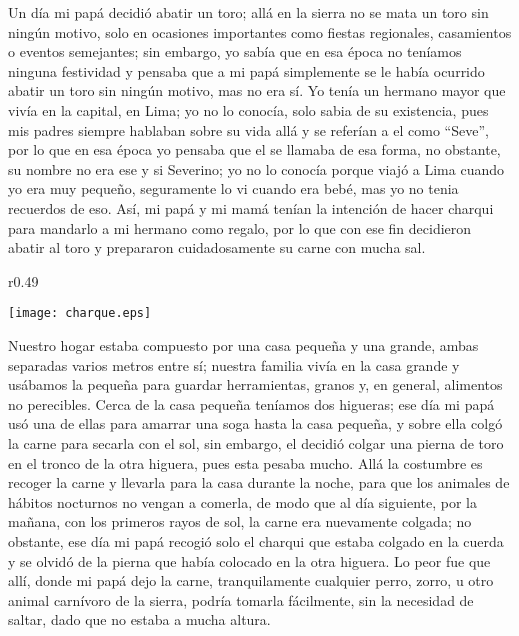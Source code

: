 Un día mi papá decidió abatir un toro; allá en la sierra no se mata un toro sin ningún motivo, solo en ocasiones importantes como fiestas regionales, casamientos o eventos semejantes; sin embargo, yo sabía que en esa época no teníamos ninguna festividad y pensaba que a mi papá simplemente se le había ocurrido abatir un toro sin ningún motivo, mas no era sí.
Yo tenía un hermano mayor que vivía en la capital, en Lima; yo no lo conocía, solo sabia de su existencia, pues mis padres siempre hablaban sobre su vida allá y se referían a el como ``Seve'', por lo que en esa época yo pensaba que el se llamaba de esa forma, no obstante, su nombre no era ese y si Severino; yo no lo conocía porque viajó a Lima cuando yo era muy pequeño, seguramente lo vi cuando era bebé, mas yo no tenia recuerdos de eso.
Así, mi papá y mi mamá tenían la intención de hacer charqui para mandarlo a mi hermano como regalo, por lo que con ese fin decidieron abatir al toro y prepararon cuidadosamente su carne con mucha sal.

\ifdefined\EnableIncludeImages
\begin{wrapfigure}{r}{0.49\textwidth}
  \begin{center}
  \vspace{-20pt}
    \texttt{[image: charque.eps]}
  \end{center}
  \vspace{-20pt}
\end{wrapfigure}
\fi
Nuestro hogar estaba compuesto por una casa pequeña y una grande, ambas separadas varios metros entre sí; nuestra familia vivía en la casa grande y usábamos la pequeña para guardar herramientas, granos y, en general, alimentos no perecibles.
Cerca de la casa pequeña teníamos dos higueras; ese día mi papá usó una de ellas para amarrar una soga hasta la casa pequeña, y sobre ella colgó la carne para secarla con el sol, sin embargo, el decidió colgar una pierna de toro en el tronco de la otra higuera, pues esta pesaba mucho.
Allá la costumbre es recoger la carne y llevarla para la casa durante la noche, para que los animales de hábitos nocturnos no vengan a comerla, de modo que al día siguiente, por la mañana, con los primeros rayos de sol, la carne era nuevamente colgada; no obstante, ese día mi papá recogió solo el charqui que estaba colgado en la cuerda y se olvidó de la pierna que había colocado en la otra higuera.
Lo peor fue que allí, donde mi papá dejo la carne, tranquilamente cualquier perro, zorro, u otro animal carnívoro de la sierra, podría tomarla fácilmente, sin la necesidad de saltar, dado que no estaba a mucha altura.

